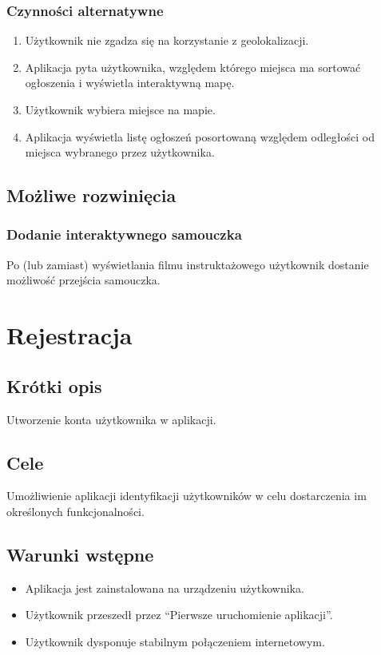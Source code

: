 \documentclass[12pt,a4paper,twoside]{article}
\begin{document}
    \subsubsection{Czynności alternatywne}


    \begin{enumerate}
        \item Użytkownik nie zgadza się na korzystanie z geolokalizacji.
        \item Aplikacja pyta użytkownika, względem którego miejsca ma sortować ogłoszenia i wyświetla interaktywną mapę.
        \item Użytkownik wybiera miejsce na mapie.
        \item Aplikacja wyświetla listę ogłoszeń posortowaną względem odległości od miejsca wybranego przez użytkownika.
    \end{enumerate}


    \subsection{Możliwe rozwinięcia}
    \subsubsection{Dodanie interaktywnego samouczka}
    Po (lub zamiast) wyświetlania filmu instruktażowego użytkownik dostanie możliwość przejścia samouczka.


    \section{Rejestracja}


    \subsection{Krótki opis}
    Utworzenie konta użytkownika w aplikacji.


    \subsection{Cele}
    Umożliwienie aplikacji identyfikacji użytkowników w celu dostarczenia im określonych funkcjonalności.


    \subsection{Warunki wstępne}
    \begin{itemize}
        \item Aplikacja jest zainstalowana na urządzeniu użytkownika.
        \item Użytkownik przeszedł przez ``Pierwsze uruchomienie aplikacji''.
        \item Użytkownik dysponuje stabilnym połączeniem internetowym.
    \end{itemize}
\end{document}
